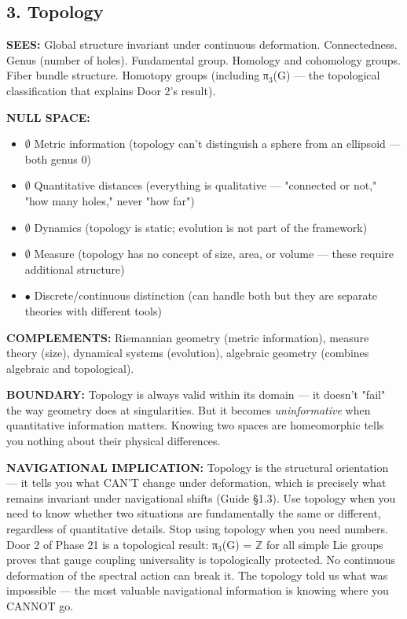 \bigskip\noindent\makebox[\textwidth]{\color{rulegray}\rule{5cm}{0.3pt}}\bigskip


\subsection*{3. Topology}


\textbf{SEES:} Global structure invariant under continuous deformation. Connectedness. Genus (number of holes). Fundamental group. Homology and cohomology groups. Fiber bundle structure. Homotopy groups (including π$_3$(G) — the topological classification that explains Door 2's result).


\textbf{NULL SPACE:}

\begin{itemize}[nosep,leftmargin=*]
  \item $\emptyset$ Metric information (topology can't distinguish a sphere from an ellipsoid — both genus 0)
  \item $\emptyset$ Quantitative distances (everything is qualitative — "connected or not," "how many holes," never "how far")
  \item $\emptyset$ Dynamics (topology is static; evolution is not part of the framework)
  \item $\emptyset$ Measure (topology has no concept of size, area, or volume — these require additional structure)
  \item $\bullet$ Discrete/\allowbreak continuous distinction (can handle both but they are separate theories with different tools)
\end{itemize}


\textbf{COMPLEMENTS:} Riemannian geometry (metric information), measure theory (size), dynamical systems (evolution), algebraic geometry (combines algebraic and topological).


\textbf{BOUNDARY:} Topology is always valid within its domain — it doesn't "fail" the way geometry does at singularities. But it becomes \textit{uninformative} when quantitative information matters. Knowing two spaces are homeomorphic tells you nothing about their physical differences.


\textbf{NAVIGATIONAL IMPLICATION:} Topology is the structural orientation — it tells you what CAN'T change under deformation, which is precisely what remains invariant under navigational shifts (Guide §1.3). Use topology when you need to know whether two situations are fundamentally the same or different, regardless of quantitative details. Stop using topology when you need numbers. Door 2 of Phase 21 is a topological result: π$_3$(G) = $\mathbb{Z}$ for all simple Lie groups proves that gauge coupling universality is topologically protected. No continuous deformation of the spectral action can break it. The topology told us what was impossible — the most valuable navigational information is knowing where you CANNOT go.


